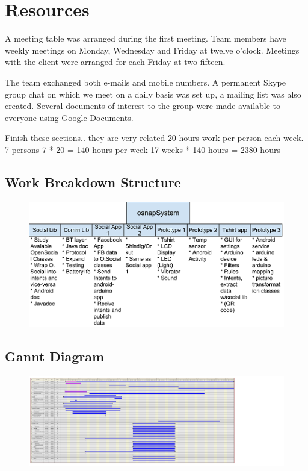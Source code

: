\newpage
\section{Resources}
A meeting table was arranged during the first meeting. Team members
have weekly meetings on Monday, Wednesday and Friday at twelve o'clock.
Meetings with the client were arranged for each Friday at two fifteen.

The team exchanged both e-mails and mobile numbers. A permanent Skype
group chat on which we meet on a daily basis was set up, a mailing
list was also created. Several documents of interest to the group
were made available to everyone using Google Documents.

\todo
{
 Finish these sections.. they are very related
}
20 hours work per person each week.
7 persons
7 * 20 = 140 hours per week
17 weeks * 140 hours = 2380 hours

\subsection{Work Breakdown Structure}

\begin{figure}[h]
\centering \includegraphics{img/mgmt-wbs.png}
\label{fig:mgmt-wbs}
\end{figure}


\subsection{Gannt Diagram}

\begin{figure}[h]
\centering \includegraphics{img/mgmt-gantt.svg}
\label{fig:mgmt-svg}
\end{figure}

